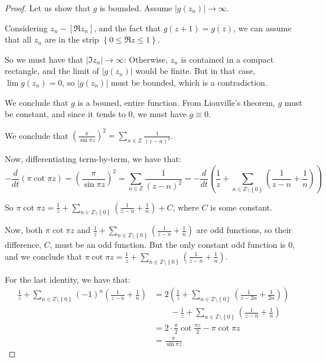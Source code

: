 \documentclass[11pt]{article} %
\theoremstyle{definition}
\newcommand{\abs}[1]{\left|#1\right|}
\begin{document}
\begin{proof}
Let us show that $g$ is bounded. Assume $\abs{g\left(z_n\right)} \to \infty$.

Considering $z_n - \left[\Re z_n\right]$, and the fact that $g\left(z+1\right) = g\left(z\right)$, we can assume that all $z_n$ are in the strip $\left\{0\leq \Re z \leq 1\right\}$.

So we must have that $\abs{\Im z_n} \to \infty$: Otherwise, $z_n$ is contained in a compact rectangle, and the limit of $\abs{g\left(z_n\right)}$ would be finite. But in that case, $\lim g\left(z_n\right) = 0$, so $\abs{g\left(z_n\right)}$ must be bounded, which is a contradiction.

We conclude that $g$ is a bouned, entire function. From Liouville's theorem, $g$ must be constant, and since it tends to $0$, we must have $g \equiv 0$.

We conclude that $\left(\frac{\pi}{\sin \pi z}\right)^2 = \sum_{n\in \mathbb{Z}} \frac{1}{\left(z-n\right)^2}$.

Now, differentiating term-by-term, we have that:
\[ -\frac{d}{dt}\left(\pi\cot \pi z\right) = \left(\frac{\pi}{\sin\pi z}\right)^2 = \sum_{n\in \mathbb{Z}} \frac{1}{\left(z-n\right)^2} = -\frac{d}{dt}\left(\frac{1}{z} + \sum_{n\in\mathbb{Z}\setminus\left\{0\right\}}\left(\frac{1}{z-n}+\frac{1}{n}\right)\right)\]

So $\pi \cot \pi z = \frac{1}{z} + \sum_{n\in\mathbb{Z}\setminus\left\{0\right\}}\left(\frac{1}{z-n}+\frac{1}{n}\right) + C$, where $C$ is some constant.

Now, both $\pi \cot \pi z$ and $\frac{1}{z} + \sum_{n\in\mathbb{Z}\setminus\left\{0\right\}}\left(\frac{1}{z-n}+\frac{1}{n}\right)$ are odd functions, so their difference, $C$, must be an odd function. But the only constant odd function is $0$, and we conclude that $\pi \cot \pi z = \frac{1}{z} + \sum_{n\in\mathbb{Z}\setminus\left\{0\right\}}\left(\frac{1}{z-n}+\frac{1}{n}\right)$.

For the last identity, we have that:
\[
\begin{split}
\frac{1}{z} + \sum_{n\in\mathbb{Z}\setminus\left\{0\right\}} \left(-1\right)^n \left(\frac{1}{z-n} + \frac{1}{n}\right) & = 2\left(\frac{1}{z} + \sum_{n\in\mathbb{Z}\setminus\left\{0\right\}}\left(\frac{1}{z-2n}+\frac{1}{2n}\right)\right) \\
& \qquad - \frac{1}{z} + \sum_{n\in\mathbb{Z}\setminus\left\{0\right\}}\left(\frac{1}{z-n}+\frac{1}{n}\right) \\
& = 2\cdot\frac{\pi}{2} \cot \frac{\pi z}{2} - \pi \cot \pi z \\
& = \frac{\pi}{\sin\pi z}
\end{split}
\]

\end{proof}
\end{document}
